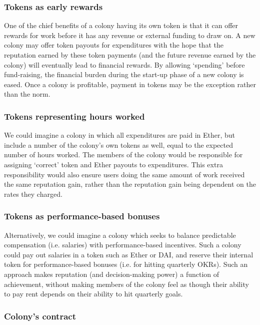 \subsubsection*{Tokens as early rewards}

One of the chief benefits of a colony having its own token is that it can offer rewards for work before it has any revenue or external funding to draw on. A new colony may offer token payouts for expenditures with the hope that the reputation earned by these token payments (and the future revenue earned by the colony) will eventually lead to financial rewards. By allowing `spending' before fund-raising, the financial burden during the start-up phase of a new colony is eased. Once a colony is profitable, payment in tokens may be the exception rather than the norm.

\subsubsection*{Tokens representing hours worked}

We could imagine a colony in which all expenditures are paid in Ether, but include a number of the colony's own tokens as well, equal to the expected number of hours worked. The members of the colony would be responsible for assigning `correct' token and Ether payouts to expenditures. This extra responsibility would also ensure users doing the same amount of work received the same reputation gain, rather than the reputation gain being dependent on the rates they charged.

\subsubsection*{Tokens as performance-based bonuses}

Alternatively, we could imagine a colony which seeks to balance predictable compensation (i.e. salaries) with performance-based incentives. Such a colony could pay out salaries in a token such as Ether or DAI, and reserve their internal token for performance-based bonuses (i.e. for hitting quarterly OKRs). Such an approach makes reputation (and decision-making power) a function of achievement, without making members of the colony feel as though their ability to pay rent depends on their ability to hit quarterly goals.

\subsubsection{Colony's  contract}

